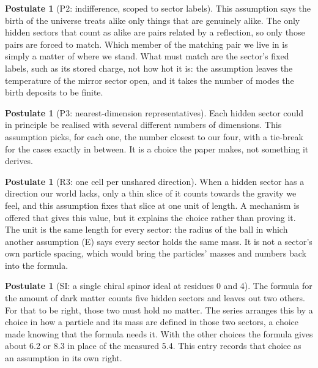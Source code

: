 \documentclass[11pt]{article}
\theoremstyle{definition}
\newtheorem{postulate}[theorem]{Postulate}
\theoremstyle{plain}
\begin{document}
\begin{postulate}[P2: indifference, scoped to sector labels]\label{c:dark-matter.p2-indifference}
This assumption says the birth of the universe treats alike only things that are genuinely alike. The only hidden sectors that count as alike are pairs related by a reflection, so only those pairs are forced to match. Which member of the matching pair we live in is simply a matter of where we stand. What must match are the sector's fixed labels, such as its stored charge, not how hot it is: the assumption leaves the temperature of the mirror sector open, and it takes the number of modes the birth deposits to be finite.
\end{postulate}

\begin{postulate}[P3: nearest-dimension representatives]\label{c:dark-matter.p3-nearest-dimension-representatives}
Each hidden sector could in principle be realised with several different numbers of dimensions. This assumption picks, for each one, the number closest to our four, with a tie-break for the cases exactly in between. It is a choice the paper makes, not something it derives.
\end{postulate}

\begin{postulate}[R3: one cell per unshared direction]\label{c:dark-matter.r3-one-cell-per-unshared-direction}
When a hidden sector has a direction our world lacks, only a thin slice of it counts towards the gravity we feel, and this assumption fixes that slice at one unit of length. A mechanism is offered that gives this value, but it explains the choice rather than proving it. The unit is the same length for every sector: the radius of the ball in which another assumption (E) says every sector holds the same mass. It is not a sector's own particle spacing, which would bring the particles' masses and numbers back into the formula.
\end{postulate}

\begin{postulate}[SI: a single chiral spinor ideal at residues 0 and 4]\label{c:dark-matter.single-ideal-at-residues-zero-and-four}
The formula for the amount of dark matter counts five hidden sectors and leaves out two others. For that to be right, those two must hold no matter. The series arranges this by a choice in how a particle and its mass are defined in those two sectors, a choice made knowing that the formula needs it. With the other choices the formula gives about 6.2 or 8.3 in place of the measured 5.4. This entry records that choice as an assumption in its own right.
\end{postulate}
\end{document}
